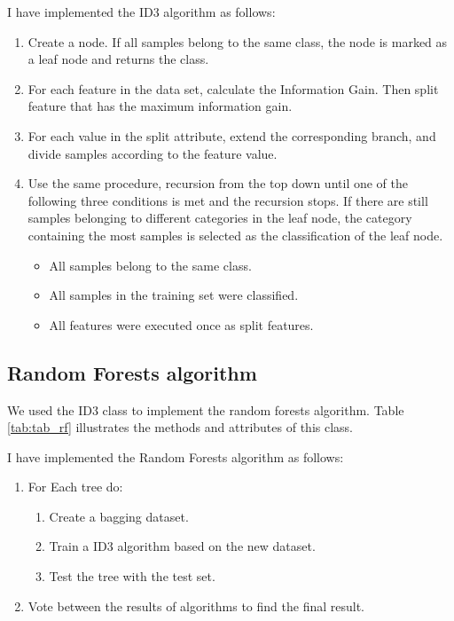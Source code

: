 I have implemented the ID3 algorithm as follows:
\begin{enumerate}
    \item Create a node. If all samples belong to the same class, the node is marked as a leaf node and returns the class.

    \item For each feature in the data set, calculate the Information Gain. Then split feature that has the maximum information gain.
        
    \item For each value in the split attribute, extend the corresponding branch, and divide samples according to the feature value.
    
    \item Use the same procedure, recursion from the top down until one of the following three conditions is met and the recursion stops. If there are still samples belonging to different categories in the leaf node, the category containing the most samples is selected as the classification of the leaf node.


    \begin{itemize}
        \item All samples belong to the same class.
        \item All samples in the training set were classified.
        \item All features were executed once as split features.
    \end{itemize}
\end{enumerate}












\subsection{Random Forests algorithm}
We used the ID3 class to implement the random forests algorithm. Table \ref{tab:tab_rf} illustrates the methods and attributes of this class. 

\begin{table}[H]
\centering
\caption{The methods and attributes of Random Forests class.}
\label{tab:tab_rf}

\end{table}

I have implemented the Random Forests algorithm as follows:
\begin{enumerate}
    \item For Each tree do:
    \begin{enumerate}
        \item Create a bagging dataset.
        \item Train a ID3 algorithm based on the new dataset.
        \item Test the tree with the test set.
    \end{enumerate}
    \item Vote between the results of algorithms to find the final result.
    
\end{enumerate}

